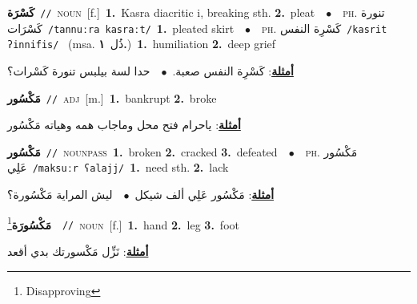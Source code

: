\documentclass[10pt,a4paper,twoside]{article} %
\begin{document}
\begin{multicols}{2}
{\setlength\topsep{0pt}\textbf{\foreignlanguage{arabic}{كَسْرَة}}\ {\color{gray}\texttt{//}\color{black}}\ \textsc{noun}\ [f.]\ \textbf{1.}~Kasra diacritic i, breaking sth.  \textbf{2.}~pleat\ \ $\bullet$\ \ \textsc{ph.} \color{gray} \foreignlanguage{arabic}{تنورة كَسْرَات}\color{black}\ {\color{gray}\texttt{/{\sffamily tannuːra kasraːt}/}\color{black}}\ \textbf{1.}~pleated skirt\ \ $\bullet$\ \ \textsc{ph.} \color{gray} \foreignlanguage{arabic}{كَسْرِة النفس}\color{black}\ {\color{gray}\texttt{/{\sffamily kasrit ʔinnifis}/}\color{black}}\ \color{gray} (msa. \foreignlanguage{arabic}{ذُل}~\foreignlanguage{arabic}{\textbf{١.}})\color{black}\ \textbf{1.}~humiliation  \textbf{2.}~deep grief\  \begin{flushright}\color{gray}\foreignlanguage{arabic}{\textbf{\underline{\foreignlanguage{arabic}{أمثلة}}}: كَسْرِة النفس صعبة.\ $\bullet$\ \  حدا لسة بيلبس تنورة كَسْرات؟}\end{flushright}\color{black}} \vspace{2mm}

{\setlength\topsep{0pt}\textbf{\foreignlanguage{arabic}{مَكْسُور}}\ {\color{gray}\texttt{//}\color{black}}\ \textsc{adj}\ [m.]\ \textbf{1.}~bankrupt  \textbf{2.}~broke\  \begin{flushright}\color{gray}\foreignlanguage{arabic}{\textbf{\underline{\foreignlanguage{arabic}{أمثلة}}}: ياحرام فتح محل وماجاب همه وهياته مَكْسُور}\end{flushright}\color{black}} \vspace{2mm}

{\setlength\topsep{0pt}\textbf{\foreignlanguage{arabic}{مَكْسُور}}\ {\color{gray}\texttt{//}\color{black}}\ \textsc{noun\textunderscore pass}\ \textbf{1.}~broken  \textbf{2.}~cracked  \textbf{3.}~defeated\ \ $\bullet$\ \ \textsc{ph.} \color{gray} \foreignlanguage{arabic}{مَكْسُور عَلِي}\color{black}\ {\color{gray}\texttt{/{\sffamily maksuːr ʕalajj}/}\color{black}}\ \textbf{1.}~need sth.  \textbf{2.}~lack\  \begin{flushright}\color{gray}\foreignlanguage{arabic}{\textbf{\underline{\foreignlanguage{arabic}{أمثلة}}}: مَكْسُور عَلِي ألف شيكل\ $\bullet$\ \  ليش المراية مَكْسُورة؟}\end{flushright}\color{black}} \vspace{2mm}

{\setlength\topsep{0pt}\textbf{\foreignlanguage{arabic}{مَكْسُورَة}}\footnote{Disapproving}\ \ {\color{gray}\texttt{//}\color{black}}\ \textsc{noun}\ [f.]\ \textbf{1.}~hand  \textbf{2.}~leg  \textbf{3.}~foot\  \begin{flushright}\color{gray}\foreignlanguage{arabic}{\textbf{\underline{\foreignlanguage{arabic}{أمثلة}}}: نَزِّل مَكْسورتك بدي أقعد}\end{flushright}\color{black}} \vspace{2mm}


\end{multicols}
\end{document}
